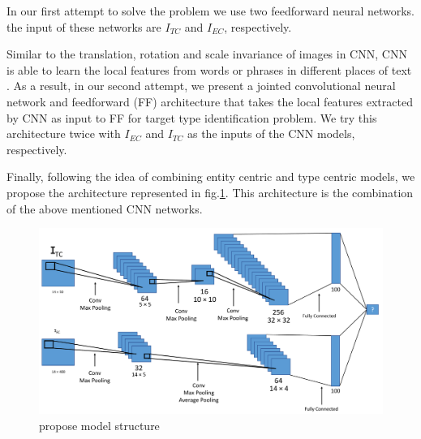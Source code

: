 In our first attempt to solve the problem we use two feedforward neural networks. the input of these networks are $I_{TC}$ and $I_{EC}$, respectively.


Similar to the translation, rotation and scale invariance of images in CNN, CNN is able to learn the local features from words or phrases in different places of text \cite{wang2016combination}. As a result, in our second attempt, we present a jointed convolutional neural network and feedforward (FF) architecture that takes the local features extracted by CNN as input to FF for target type identification problem. We try this architecture twice with $I_{EC}$ and $I_{TC}$ as the inputs of the CNN models, respectively.

Finally, following the idea of combining entity centric and type centric models\cite{Balog:2011:QME:2037661.2037667,Garigliotti:2017:TTI:3077136.3080659}, we propose the architecture represented in fig.\ref{proposeModel}. This architecture is the combination of the above mentioned CNN networks.
\begin{figure}
	\includegraphics[width=\textwidth]{1_model_cropped.pdf} \caption{propose model structure}\label{proposeModel}
\end{figure}

